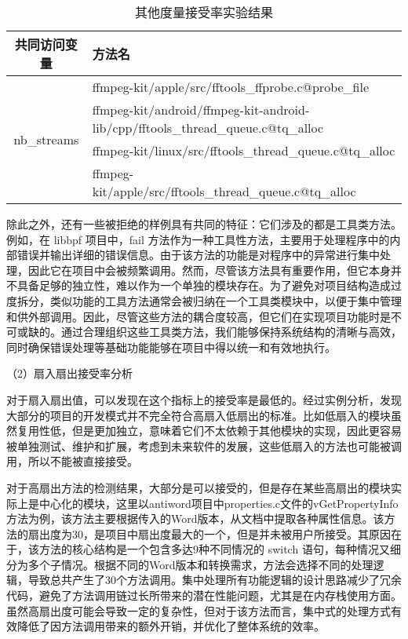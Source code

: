 \begin{table}[htbp]
\caption{其他度量接受率实验结果}
\vspace{0.5em}\centering\wuhao
\begin{tabular}{cp{12cm}}
\toprule
共同访问变量 & 方法名 \\
\midrule
\multirow{4}{*}{nb\_streams} & ffmpeg-kit/apple/src/fftools\_ffprobe.c@probe\_file \\
                              & ffmpeg-kit/android/ffmpeg-kit-android-lib/cpp/fftools\_thread\_queue.c@tq\_alloc  \\
                              & ffmpeg-kit/linux/src/fftools\_thread\_queue.c@tq\_alloc  \\
                              & ffmpeg-kit/apple/src/fftools\_thread\_queue.c@tq\_alloc  \\
\bottomrule
\end{tabular}
\end{table}


除此之外，还有一些被拒绝的样例具有共同的特征：它们涉及的都是工具类方法。例如，在 libbpf 项目中，fail 方法作为一种工具性方法，主要用于处理程序中的内部错误并输出详细的错误信息。由于该方法的功能是对程序中的异常进行集中处理，因此它在项目中会被频繁调用。然而，尽管该方法具有重要作用，但它本身并不具备足够的独立性，难以作为一个单独的模块存在。为了避免对项目结构造成过度拆分，类似功能的工具方法通常会被归纳在一个工具类模块中，以便于集中管理和供外部调用。因此，尽管这些方法的耦合度较高，但它们在实现项目功能时是不可或缺的。通过合理组织这些工具类方法，我们能够保持系统结构的清晰与高效，同时确保错误处理等基础功能能够在项目中得以统一和有效地执行。

（2）扇入扇出接受率分析

对于扇入扇出值，可以发现在这个指标上的接受率是最低的。经过实例分析，发现大部分的项目的开发模式并不完全符合高扇入低扇出的标准。比如低扇入的模块虽然复用性低，但是更加独立，意味着它们不太依赖于其他模块的实现，因此更容易被单独测试、维护和扩展，考虑到未来软件的发展，这些低扇入的方法也可能被调用，所以不能被直接接受。

对于高扇出方法的检测结果，大部分是可以接受的，但是存在某些高扇出的模块实际上是中心化的模块，这里以antiword项目中properties.c文件的vGetPropertyInfo方法为例，该方法主要根据传入的Word版本，从文档中提取各种属性信息。该方法的扇出度为30，是项目中扇出度最大的一个，但是并未被用户所接受。其原因在于，该方法的核心结构是一个包含多达9种不同情况的 switch 语句，每种情况又细分为多个子情况。根据不同的Word版本和转换需求，方法会选择不同的处理逻辑，导致总共产生了30个方法调用。集中处理所有功能逻辑的设计思路减少了冗余代码，避免了方法调用链过长所带来的潜在性能问题，尤其是在内存栈使用方面。虽然高扇出度可能会导致一定的复杂性，但对于该方法而言，集中式的处理方式有效降低了因方法调用带来的额外开销，并优化了整体系统的效率。

